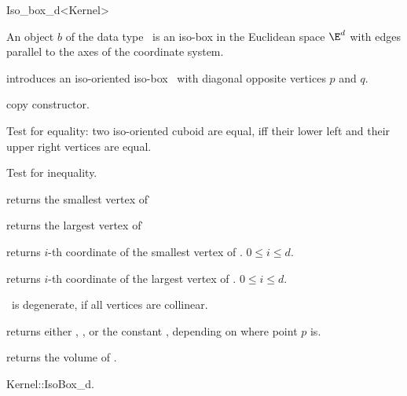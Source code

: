 \begin{ccRefClass} {Iso_box_d<Kernel>}

\ccDefinition  An object $b$ of the data type \ccRefName\ is an
iso-box in the Euclidean space $\E^d$ with edges parallel to the 
axes of the coordinate system.
 
\ccCreation
{}

            {introduces an iso-oriented iso-box \ccVar\ with diagonal
             opposite vertices $p$ and $q$. 
}

\ccHidden {}
            {copy constructor.}

\ccOperations

       {Test for equality: two iso-oriented cuboid are equal, iff their
        lower left and their upper right vertices are equal.}

       {Test for inequality.}


       {returns the smallest vertex of \ccVar\.}


       {returns the largest vertex of \ccVar\.}


         {returns $i$-th  coordinate of
          the smallest vertex of \ccVar. 
          \ccPrecond $0 \leq i \leq d$.}

         {returns $i$-th  coordinate of
          the largest vertex of \ccVar. 
          \ccPrecond $0 \leq i \leq d$.}

\ccPredicates

       {%
        \ccVar\ is degenerate, if all vertices
        are collinear.}

       {returns either ,
        , or the constant
        , 
        depending on where point $p$ is.}

       {}
\ccGlue
{}
       {}
\ccGlue
{}
       {}


       {returns the volume of \ccVar. }

\ccSeeAlso
Kernel::IsoBox\_d. \\

\end{ccRefClass} 

